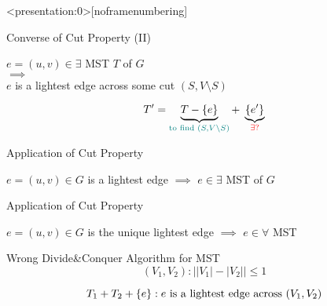 \begin{frame}<presentation:0>[noframenumbering]
  \begin{exampleblock}{Converse of Cut Property (II)}
    \begin{center}
      $e = (u,v) \in \exists$ MST $T$ of $G$ \\[6pt]
      $\implies$ \\[6pt]
      $e$ is a lightest edge across some cut $(S, V \setminus S)$
    \end{center}
  \end{exampleblock}

  \pause
  \[
    T' = \underbrace{T - \left\{e\right\}}_{\textcolor{teal}{\text{to find } (S, V \setminus S)}} +\; \underbrace{\left\{e'\right\}}_{\textcolor{red}{\exists?}}
  \]
\end{frame}

\begin{frame}{}
  \begin{exampleblock}{Application of Cut Property}
    \centerline{$e = (u,v) \in G$ is a lightest edge $\implies$ $e \in \exists$ MST of $G$}
  \end{exampleblock}


  \begin{exampleblock}{Application of Cut Property}
    \centerline{$e = (u,v) \in G$ is the unique lightest edge $\implies$ $e \in \forall$ MST}
  \end{exampleblock}
\end{frame}

\begin{frame}{}
  \begin{exampleblock}{Wrong Divide\&Conquer Algorithm for MST}
    \[
      (V_{1}, V_{2}): \Big\rvert |V_{1}| - |V_{2}| \Big\rvert \le 1
    \]
    
    \[
      T_{1} + T_{2} + \left\{e\right\}: e \text{ is a lightest edge across } (V_{1}, V_{2})
    \]
  \end{exampleblock}

  \pause
  \vspace{0.30cm}
\end{frame}
